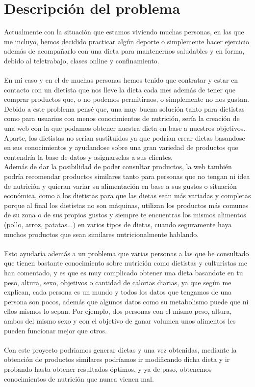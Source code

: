 \chapter{Descripción del problema}

Actualmente con la situación que estamos viviendo muchas personas, en las que me incluyo, hemos 
decidido practicar algún deporte o simplemente hacer ejercicio además de acompañarlo con una dieta 
para mantenernos saludables y en forma, debido al teletrabajo, clases online y confinamiento.
\\\\
En mi caso y en el de muchas personas hemos tenido que contratar y estar en contacto con un dietista que nos lleve la dieta 
cada mes además de tener que comprar productos que, o no podemos permitirnos, o simplemente no nos gustan.\\

Debido a este problema pensé que, una muy buena solución tanto para dietistas como para usuarios con menos conocimientos de 
nutrición, sería la creación de una web con la que podamos obtener nuestra dieta en base a nuestros objetivos. Aparte, los 
dietistas no serían sustituidos ya que podrían crear dietas basandose en sus conocimientos y ayudandose sobre una gran variedad 
de productos que contendría la base de datos y asignarselas a sus clientes.\\

Además de dar la posibilidad de poder consultar productos, la web también podría recomendar productos similares tanto para personas que no 
tengan ni idea de nutrición y quieran variar su alimentación en base a sus gustos o situación económica, como a los dietistas para que 
las dietas sean más variadas y completas porque al final los dietistas no son máquinas, utilizan los productos más comunes de su zona o de sus propios gustos
y siempre te encuentras los mismos alimentos (pollo, arroz, patatas...) en varios tipos de dietas, cuando seguramente haya muchos productos que
sean similares nutricionalmente hablando.
\\\\
Esto ayudaría además a un problema que varias personas a las que he consultado que tienen bastante conocimiento sobre nutrición como dietistas y culturistas me han comentado, 
y es que es muy complicado obtener una dieta basandote en tu peso, altura, sexo, objetivos o cantidad de calorias diarias, ya que según me explican,
cada persona es un mundo y todos los datos que tengamos de una persona son pocos, además que algunos datos como su metabolismo puede que ni ellos mismos lo sepan.
Por ejemplo, dos personas con el mismo peso, altura, ambos del mismo sexo y con el objetivo de ganar volumen unos alimentos les pueden funcionar mejor que otros.\\ \\

Con este proyecto podriamos generar dietas y una vez obtenidas, mediante la obtención de productos similares podríamos ir modificando dicha dieta y ir probando hasta obtener resultados
óptimos, y ya de paso, obtenemos conocimientos de nutrición que nunca vienen mal.